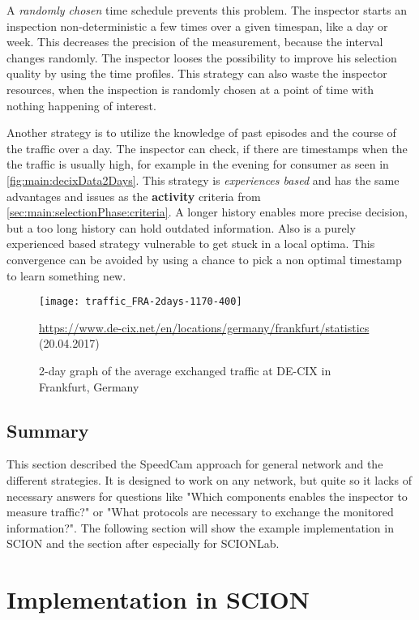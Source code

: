 \documentclass[thesis.tex]{subfiles}
\begin{document}
A \textit{randomly chosen} time schedule prevents this problem. The inspector starts an inspection non-deterministic a few times over a given timespan, like a day or week. This decreases the precision of the measurement, because the interval changes randomly. The inspector looses the possibility to improve his selection quality by using the time profiles. This strategy can also waste the inspector resources, when the inspection is randomly chosen at a point of time with nothing happening of interest.

Another strategy is to utilize the knowledge of past episodes and the course of the traffic over a day. The inspector can check, if there are timestamps when the the traffic is usually high, for example in the evening for consumer as seen in \autoref{fig:main:decixData2Days}. This strategy is \textit{experiences based} and has the same advantages and issues as the \textbf{activity} criteria from \autoref{sec:main:selectionPhase:criteria}. A longer history enables more precise decision, but a too long history can hold outdated information. Also is a purely experienced based strategy vulnerable to get stuck in a local optima. This convergence can be avoided by using a chance to pick a non optimal timestamp to learn something new.


\begin{figure}
	\centering
	\texttt{[image: traffic\_FRA-2days-1170-400]}
	\caption*{\tiny{ \url{https://www.de-cix.net/en/locations/germany/frankfurt/statistics} (20.04.2017)}}
	\caption{2-day graph of the average exchanged traffic at DE-CIX in Frankfurt, Germany}
	\label{fig:main:decixData2Days}
\end{figure}

\subsection{Summary}
This section described the SpeedCam approach for general network and the different strategies. It is designed to work on any network, but quite so it lacks of necessary answers for questions like "Which components enables the inspector to measure traffic?" or "What protocols are necessary to exchange the monitored information?". The following section will show the example implementation in SCION and the section after especially for SCIONLab.

\section{Implementation in SCION} \label{sec:main:scionimpl}
\end{document}
